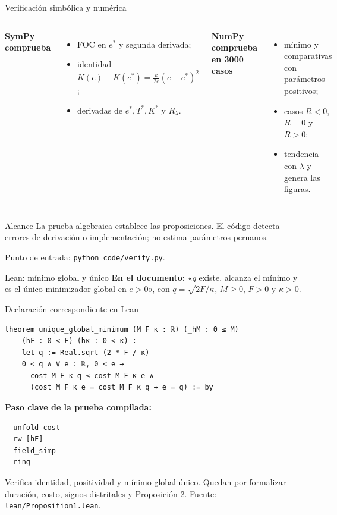 \documentclass[aspectratio=169,11pt]{beamer}
\newcommand{\nota}[1]{\par\vfill{\footnotesize\color{blue}#1}}
\begin{document}
\begin{frame}{Verificación simbólica y numérica}
\begin{columns}[T]
\textbf{SymPy comprueba}\par
\begin{itemize}
\item FOC en $e^*$ y segunda derivada;
\item identidad $K(e)-K(e^*)=\frac{\kappa}{2e}(e-e^*)^2$;
\item derivadas de $e^*,T^*,K^*$ y $R_{\lambda}$.
\end{itemize}
\textbf{NumPy comprueba en 3000 casos}\par
\begin{itemize}
\item mínimo y comparativas con parámetros positivos;
\item casos $R<0$, $R=0$ y $R>0$;
\item tendencia con $\lambda$ y genera las figuras.
\end{itemize}
\end{columns}
\begin{block}{Alcance}
La prueba algebraica establece las proposiciones. El código detecta errores de derivación o implementación; no estima parámetros peruanos.
\end{block}
\nota{Punto de entrada: \texttt{python code/verify.py}.}
\end{frame}

\begin{frame}[fragile]{Lean: mínimo global y único}
\textbf{En el documento:} «$q$ existe, alcanza el mínimo y es el único minimizador global en $e>0$», con $q=\sqrt{2F/\kappa}$, $M\ge0$, $F>0$ y $\kappa>0$.
\begin{block}{Declaración correspondiente en Lean}
\begin{lstlisting}
theorem unique_global_minimum (M F κ : ℝ) (_hM : 0 ≤ M)
    (hF : 0 < F) (hκ : 0 < κ) :
    let q := Real.sqrt (2 * F / κ)
    0 < q ∧ ∀ e : ℝ, 0 < e →
      cost M F κ q ≤ cost M F κ e ∧
      (cost M F κ e = cost M F κ q ↔ e = q) := by
\end{lstlisting}
\end{block}
\vspace{-0.5em}
\textbf{Paso clave de la prueba compilada:}
\begin{lstlisting}
  unfold cost
  rw [hF]
  field_simp
  ring
\end{lstlisting}
\nota{Verifica identidad, positividad y mínimo global único. Quedan por formalizar duración, costo, signos distritales y Proposición 2. Fuente: \texttt{lean/Proposition1.lean}.}
\end{frame}
\end{document}
